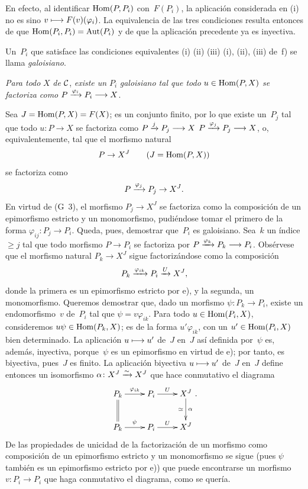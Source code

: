 \begin{enumerateb}
En efecto, al identificar $\Hom(P,P_i)$ con~$F(P_i)$, la aplicación
considerada en (i) no es sino $v\mto F(v)(\varphi_i)$. La equivalencia de las
tres condiciones resulta entonces de que
$\Hom(P_i,P_i)=\Aut(P_i)$ y de que la aplicación precedente ya es inyectiva.

Un~$P_i$ que satisface las condiciones equivalentes
{(i) (ii) (iii)}
{(i), (ii), (iii)}
de~f) se llama \emph{galoisiano}.
%

\item[g)] \emph{Para todo} $X$ \emph{de} $\cal{C}$, \emph{existe un}
$P_i$ \emph{galoisiano tal que todo} $u\in\Hom(P,X)$ \emph{se factoriza
como} $P\lto{\varphi_i}P_i\longrightarrow X$.

Sea $J=\Hom(P,X)=F(X)$; es un conjunto finito, por lo que existe un~$P_j$ tal
que todo $u\colon P\to X$ se factoriza como
{$P\lto{j}P_j\longrightarrow X$}
{$P\lto{\varphi_j}P_j\longrightarrow X$},
o, equivalentemente, tal que el morfismo natural
$$
P\to X^J\qquad(J=\Hom(P,X))
$$
se factoriza como
$$
P\lto{\varphi_j}P_j\to X^J.
$$
En virtud de
(G~3), el morfismo $P_j\to X^J$ se factoriza como la composición de un
epimorfismo estricto y un monomorfismo, pudiéndose tomar el primero de la
forma $\varphi_{ij}\colon P_j\to P_i$. Queda, pues, demostrar que~$P_i$ es
galoisiano. Sea~$k$ un índice $\geq j$ tal que todo morfismo $P\to P_i$ se
factoriza por $P\lto{\varphi_k}P_k\longrightarrow P_i$. Obsérvese que el
morfismo natural $P_k\to X^J$ sigue factorizándose como la composición
$$
P_k\lto{\varphi_{ik}}P_i\lto{U}X^J,
$$
donde la primera  es un epimorfismo
estricto por e), y la segunda, un monomorfismo. Queremos demostrar que, dado
un morfismo $\psi\colon P_k\to P_i$, existe un endomorfismo~$v$ de~$P_i$ tal
que $\psi=v\varphi_{ik}$. Para todo $u\in\Hom(P_i,X)$, consideremos
$u\psi\in\Hom(P_k,X)$; es de la forma $u'\varphi_{ik}$, con un
$u'\in\Hom(P_i,X)$ bien determinado. La aplicación $u\mto u'$ de~$J$ en~$J$
así definida por~$\psi$ es, además, inyectiva, porque~$\psi$ es un
epimorfismo en virtud de e); por tanto, es biyectiva, pues~$J$ es finito. La
aplicación biyectiva $u\mto u'$ de~$J$ en~$J$ define entonces un isomorfismo
$\alpha\colon X^J\isomto X^J$ que hace conmutativo el diagrama
$$
\xymatrix{P_k \ar[r]^-{\varphi_{ik}} \ar@{=}[d] & P_i \ar[r]^-U & X^J
\ar[d]^-{\alpha}_-{\simeq} \\ P_k \ar[r]^{\psi} & P_i \ar[r]^-U & X^J}.
$$
De las propiedades de unicidad de la factorización de un morfismo como
composición de un epimorfismo estricto y un monomorfismo se sigue (pues
$\psi$ también es un epimorfismo estricto por e)) que puede encontrarse un
morfismo $v\colon P_i\to P_i$ que haga conmutativo el diagrama, como se
quería.


\end{enumerateb}
